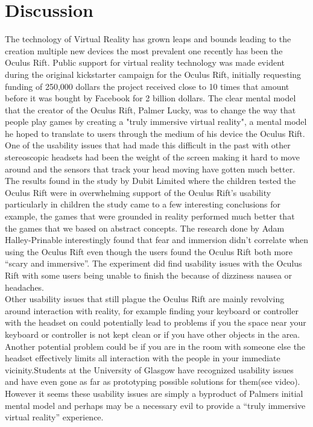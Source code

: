 \documentclass[a4paper]{article}
\begin{document}
\section{Discussion}


\indent \indent The technology of Virtual Reality has grown leaps and bounds leading to the creation multiple new devices the most prevalent one recently has been the Oculus Rift. Public support for virtual reality technology was made evident during the original kickstarter campaign for the Oculus Rift, initially requesting funding of 250,000 dollars the project received close to 10 times that amount before it was bought by Facebook for 2 billion dollars. The clear mental model that the creator of the Oculus Rift, Palmer Lucky, was to change the way that people play games by creating a "truly immersive virtual reality"\cite{3}, a mental model he hoped to translate to users through the medium of his device the Oculus Rift. One of the usability issues that had made this difficult in the past with other stereoscopic headsets had been the weight of the screen making it hard to move around and the sensors that track your head moving have gotten much better. The results found in the study by Dubit Limited where the children tested the Oculus Rift were in overwhelming support of the Oculus Rift’s usability particularly in children the study came to a few interesting conclusions for example, the games that were grounded in reality performed much better that the games that we based on abstract concepts. The research done by Adam Halley-Prinable interestingly found that fear and immersion didn’t correlate when using the Oculus Rift even though the users found the Oculus Rift both more “scary and immersive”\cite{7}. The experiment did find usability issues with the Oculus Rift with some users being unable to finish the because of dizziness nausea or  headaches.\\
\indent Other usability issues that still plague the Oculus Rift are mainly revolving around interaction with reality, for example finding your keyboard or controller with the headset on could potentially lead to problems if you the space near your keyboard or controller is not kept clean or if you have other objects in the area. Another potential problem could be if you are in the room with someone else the headset effectively limits all interaction with the people in your immediate vicinity.Students at the University of Glasgow have recognized usability issues and have even gone as far as prototyping possible solutions for them(see video\cite{5}). However it seems these usability issues are simply a byproduct of Palmers initial mental model and perhaps may be a necessary evil to provide a “truly immersive virtual reality” experience\cite{3}.\\ 
\end{document}

